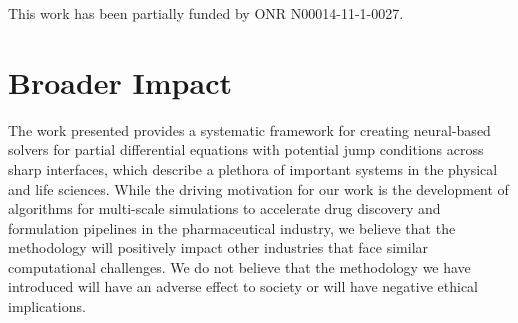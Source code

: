 \documentclass{article}
\newcommand{\fgibou}[1]{\textcolor{blue}{[#1]$_{\rm FG}$}}
\begin{document}
\begin{ack}
This work has been partially funded by ONR N00014-11-1-0027.
\end{ack}


\section*{Broader Impact}

The work presented provides a systematic framework for creating neural-based solvers for partial differential equations with potential jump conditions across sharp interfaces, which describe a plethora of important systems in the physical and life sciences. While the driving motivation for our work is the development of algorithms for multi-scale simulations to accelerate drug discovery and formulation pipelines in the pharmaceutical industry, we believe that the methodology will positively impact other industries that face similar computational challenges. We do not believe that the methodology we have introduced will have an adverse effect to society or will have negative ethical implications.





\end{document}
